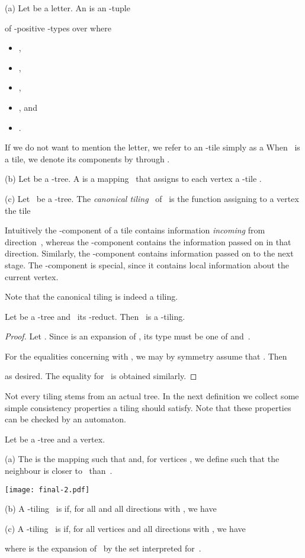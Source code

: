 \documentclass{LMCS}
\begin{document}
\begin{defi}
\textup{(a)}
Let  be a letter.
An  is an -tuple

of -positive -types over  where
\begin{itemize}
\item ,
\item ,
\item ,
\item , and
\item .
\end{itemize}
If we do not want to mention the letter,
we refer to an -tile simply as a 
When ~is a tile,
we denote its components by  through .

\textup{(b)}
Let  be a -tree.
A  is a mapping~ that assigns to each
vertex  a -tile .

\textup{(c)}
Let ~be a -tree.
The \emph{canonical tiling}~ of~ is the function
assigning to a vertex~ the tile

\end{defi}

Intuitively the -component of a tile
contains information \emph{incoming} from direction~,
whereas the -component contains the information passed on in that direction.
Similarly, the -component contains information passed on to the next stage.
The -component is special, since it contains local information about the current vertex.

Note that the canonical tiling is indeed a tiling.
\begin{lem}\label{lem:tile is such}
Let  be a -tree and ~its -reduct.
Then ~is a -tiling.
\end{lem}
\begin{proof}
Let .
Since  is an expansion of ,
its type  must be one of  and~.

For the equalities concerning  with ,
we may by symmetry assume that . Then

as desired.
The equality for~ is obtained similarly.
\end{proof}

Not every tiling stems from an actual tree.
In the next definition we collect some simple consistency properties
a tiling should satisfy.
Note that these properties can be checked by an automaton.

\begin{defi}
Let  be a -tree and  a vertex.

\textup{(a)}
The 
is the mapping 
such that  and, for vertices ,
we define  such that the neighbour  is closer to~ than~.
\begin{center}
\texttt{[image: final-2.pdf]}
\end{center}

\textup{(b)}
A -tiling~ is 
if, for all  and all directions  with ,
we have


\textup{(c)}
A -tiling~ is 
if, for all vertices  and all directions  with ,
we have

where  is the expansion of~
by the set  interpreted for~.
\end{defi}
\end{document}
